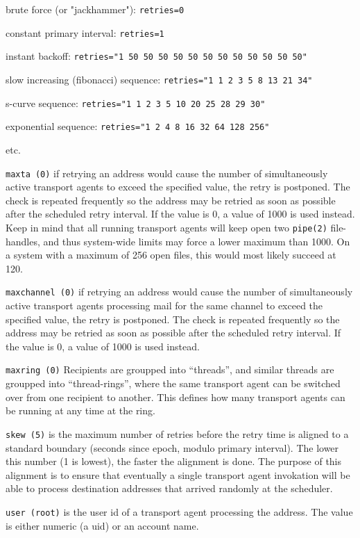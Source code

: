 brute force (or "jackhammer"): {\tt  retries=0 }

constant primary interval: {\tt  retries=1 }

instant backoff: {\tt  retries="1 50 50 50 50 50 50 50 50 50 50 50 50" }

slow increasing (fibonacci) sequence: {\tt  retries="1 1 2 3 5 8 13 21 34" }

s-curve sequence: {\tt  retries="1 1 2 3 5 10 20 25 28 29 30" }

exponential sequence: {\tt  retries="1 2 4 8 16 32 64 128 256" }

etc.

{\tt maxta (0)} 
if retrying an address would cause the number of simultaneously 
active transport agents to exceed the specified  value, the retry is  
postponed. The check is repeated  frequently so  the address may be retried as
soon as possible after the  scheduled  retry interval. If the value is 0, 
a value of 1000 is used instead. Keep in mind that all  running  
transport  agents  will  keep open two {\tt pipe(2)} file-handles, and thus 
system-wide  limits may force a lower maximum than 1000. On a system
with a maximum of 256 open files, this would most likely succeed at 120.

{\tt maxchannel (0)}
if retrying an address would cause the number of 
simultaneously  active  transport agents processing mail for
the same channel to exceed  the  specified  value,  the
retry  is  postponed.  The check is repeated frequently
so the address may be retried as soon as possible after
the  scheduled  retry  interval.   If the value is 0, a
value of 1000 is used instead.

{\tt maxring (0)}
Recipients are groupped into ``threads'',  and  similar
threads  are groupped into ``thread-rings'', where the same
transport agent can be switched over from one recipient
to another.  This defines how many transport agents can
be running at any time at the ring.

{\tt skew (5)}
is the maximum number of retries before the retry  time
is aligned to a standard boundary (seconds since epoch,
modulo primary interval).  The lower this number (1  is
lowest), the faster the alignment is done.  The purpose
of this alignment is to ensure that eventually a single
transport agent invokation will be able to process 
destination addresses that arrived randomly at the  scheduler.

{\tt user (root)}
is  the  user  id  of  a transport agent processing the
address.  The value is either numeric  (a  uid)  or  an
account name.

